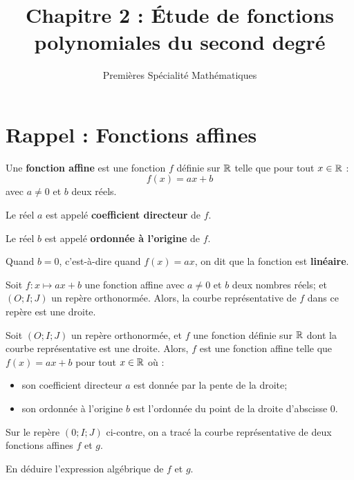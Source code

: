 \documentclass{poly}
\title{Chapitre 2 : Étude de fonctions polynomiales du second degré}
\date{}
\author{Premières Spécialité Mathématiques}
\begin{document}
\maketitle
\section{Rappel : Fonctions affines}
\begin{definition}
Une \textbf{fonction affine} est une fonction $f$ définie sur $\mathbb{R}$ telle que pour tout $x \in \mathbb{R}$ :
\begin{equation*}
f(x) = ax + b
\end{equation*}
avec $a \neq 0$ et $b$ deux réels.

Le réel $a$ est appelé \textbf{coefficient directeur} de $f$.

Le réel $b$ est appelé \textbf{ordonnée à l'origine} de $f$.
\end{definition}
\begin{remark}
Quand $b = 0$, c'est-à-dire quand $f(x) = ax$, on dit que la fonction est \textbf{linéaire}.
\end{remark}
\begin{proposition}
Soit $f : x \mapsto ax + b$ une fonction affine avec $a \neq 0$ et $b$ deux nombres réels; et $(O;I;J)$ un repère orthonormée. Alors, la courbe représentative de $f$ dans ce repère est une droite.
\end{proposition}
\begin{proposition}
Soit $(O;I;J)$ un repère orthonormée, et $f$ une fonction définie sur $\mathbb{R}$ dont la courbe représentative est une droite. Alors, $f$ est une fonction affine telle que $f(x) = ax + b$ pour tout $x \in \mathbb{R}$ où :
\begin{itemize}
\item son coefficient directeur $a$ est donnée par la pente de la droite;
\item son ordonnée à l'origine $b$ est l'ordonnée du point de la droite d'abscisse $0$.
\end{itemize}
\end{proposition}
\newpage
\begin{exercize}
\label{ex:affine}
Sur le repère $(0;I;J)$ ci-contre, on a tracé la courbe représentative de deux fonctions affines $f$ et $g$.
\begin{center}
\end{center}
En déduire l'expression algébrique de $f$ et $g$.
\end{exercize}
\end{document}
